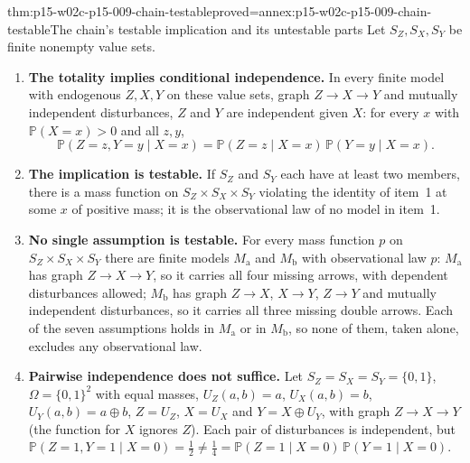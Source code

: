 \begin{hbtheorem}{thm:p15-w02c-p15-009-chain-testable}{proved=annex:p15-w02c-p15-009-chain-testable}{The chain's testable implication and its untestable parts}
Let \(S_Z,S_X,S_Y\) be finite nonempty value sets.
\begin{enumerate}
\item \textbf{The totality implies conditional independence.} In every
      finite model with endogenous \(Z,X,Y\) on these value sets, graph
      \(Z\to X\to Y\) and mutually independent disturbances, \(Z\) and
      \(Y\) are independent given \(X\): for every \(x\) with
      \(\mathbb P(X=x)>0\) and all \(z,y\),
      \[
       \mathbb P(Z=z,Y=y\mid X=x)
       =\mathbb P(Z=z\mid X=x)\,\mathbb P(Y=y\mid X=x).
      \]
\item \textbf{The implication is testable.} If \(S_Z\) and \(S_Y\) each
      have at least two members, there is a mass function on
      \(S_Z\times S_X\times S_Y\) violating the identity of item~1 at
      some \(x\) of positive mass; it is the observational law of no
      model in item~1.
\item \textbf{No single assumption is testable.} For every mass function
      \(p\) on \(S_Z\times S_X\times S_Y\) there are finite models
      \(M_{\mathrm a}\) and \(M_{\mathrm b}\) with observational law \(p\):
      \(M_{\mathrm a}\) has graph \(Z\to X\to Y\), so it carries all four
      missing arrows, with dependent disturbances allowed;
      \(M_{\mathrm b}\) has graph \(Z\to X\), \(X\to Y\), \(Z\to Y\) and
      mutually independent disturbances, so it carries all three missing
      double arrows. Each of the seven assumptions holds in
      \(M_{\mathrm a}\) or in \(M_{\mathrm b}\), so none of them, taken
      alone, excludes any observational law.
\item \textbf{Pairwise independence does not suffice.} Let
      \(S_Z=S_X=S_Y=\{0,1\}\), \(\Omega=\{0,1\}^2\) with equal masses,
      \(U_Z(a,b)=a\), \(U_X(a,b)=b\), \(U_Y(a,b)=a\oplus b\),
      \(Z=U_Z\), \(X=U_X\) and \(Y=X\oplus U_Y\), with graph
      \(Z\to X\to Y\) (the function for \(X\) ignores \(Z\)). Each pair
      of disturbances is independent, but
      \(\mathbb P(Z=1,Y=1\mid X=0)=\tfrac12\ne\tfrac14
      =\mathbb P(Z=1\mid X=0)\,\mathbb P(Y=1\mid X=0)\).
\end{enumerate}
\end{hbtheorem}

